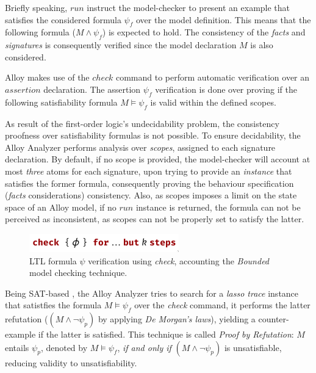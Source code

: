 Briefly speaking, $run$ instruct the model-checker to present an example that satisfies the considered formula $\psi_{f}$ over the model definition. This means that the following formula ($M \wedge \psi_{f}$) is expected to hold. The consistency of the \textit{facts} and \textit{signatures} is consequently verified since the model declaration $M$ is also considered. 

Alloy makes use of the $check$ command to perform automatic verification over an $assertion$ declaration. The assertion $\psi_{f}$ verification is done over proving if the following satisfiability formula $M \models \psi_{f}$ is valid within the defined scopes. %

As result of the first-order logic's undecidability problem, the consistency proofness over satisfiability formulas is not possible. \cite{vakili2012temporal} To ensure decidability, the Alloy Analyzer performs analysis over \textit{scopes}, assigned to each signature declaration. By default, if no scope is provided, the model-checker will account at most \textit{three} atoms for each signature, upon trying to provide an \textit{instance} that satisfies the former formula, consequently proving the behaviour specification (\textit{facts} considerations) consistency. Also, as scopes imposes a limit on the state space of an Alloy model, if no $run$ instance is returned, the formula can not be perceived as inconsistent, as scopes can not be properly set to satisfy the latter.

\begin{figure}[H]
    \centering
    \includegraphics[width=0.4\linewidth]{images/check_alloy_1.png}
    \caption{LTL formula $\psi$ verification using \textit{check}, accounting the \textit{Bounded} model checking technique.}
    \label{fig:alloy-check-1}
\end{figure}

Being SAT-based \cite{lwspecification}, the Alloy Analyzer tries to search for a \textit{lasso trace} instance that satistfies the formula $M \models \psi_{f}$ over the \textit{check} command, it performs the latter refutation ($(M \wedge \neg \psi_{p})$ by applying \textit{De Morgan's laws}), yielding a counter-example if the latter is satisfied. This technique is called \textit{Proof by Refutation}: $M$ entails $\psi_{p}$, denoted by $M \models \psi_{f}$, \textit{if and only if} $(M \wedge \neg \psi_{p})$ is unsatisfiable, reducing validity to unsatisfiability.

